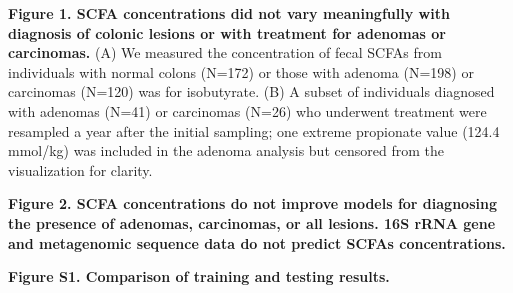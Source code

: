 \documentclass[11pt,]{article}
\begin{document}
\textbf{Figure 1. SCFA concentrations did not vary meaningfully with
diagnosis of colonic lesions or with treatment for adenomas or
carcinomas.} (A) We measured the concentration of fecal SCFAs from
individuals with normal colons (N=172) or those with adenoma (N=198) or
carcinomas (N=120) was for isobutyrate. (B) A subset of individuals
diagnosed with adenomas (N=41) or carcinomas (N=26) who underwent
treatment were resampled a year after the initial sampling; one extreme
propionate value (124.4 mmol/kg) was included in the adenoma analysis
but censored from the visualization for clarity.

\newpage

\textbf{Figure 2. SCFA concentrations do not improve models for
diagnosing the presence of adenomas, carcinomas, or all lesions. 16S
rRNA gene and metagenomic sequence data do not predict SCFAs
concentrations.}

\newpage

\textbf{Figure S1. Comparison of training and testing results.}
\end{document}
